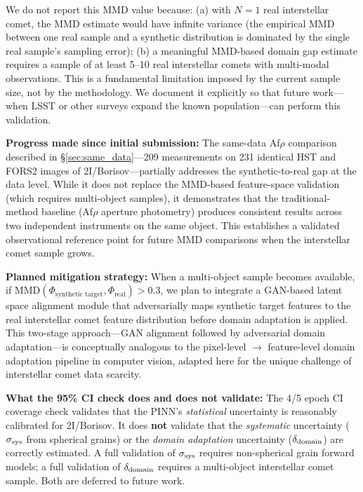 \documentclass[usenatbib]{mnras}
\begin{document}
We do not report this MMD value because: (a) with $N=1$ real interstellar comet, the MMD estimate would have infinite variance (the empirical MMD between one real sample and a synthetic distribution is dominated by the single real sample's sampling error); (b) a meaningful MMD-based domain gap estimate requires a sample of at least 5--10 real interstellar comets with multi-modal observations. This is a fundamental limitation imposed by the current sample size, not by the methodology. We document it explicitly so that future work---when LSST or other surveys expand the known population---can perform this validation.

\textbf{Progress made since initial submission:} The same-data Af$\rho$ comparison described in \S\ref{sec:same_data}---209 measurements on 231 identical HST and FORS2 images of 2I/Borisov---partially addresses the synthetic-to-real gap at the data level. While it does not replace the MMD-based feature-space validation (which requires multi-object samples), it demonstrates that the traditional-method baseline (Af$\rho$ aperture photometry) produces consistent results across two independent instruments on the same object. This establishes a validated observational reference point for future MMD comparisons when the interstellar comet sample grows.

\textbf{Planned mitigation strategy:} When a multi-object sample becomes available, if $\text{MMD}(\Phi_{\text{synthetic target}}, \Phi_{\text{real}}) > 0.3$, we plan to integrate a GAN-based latent space alignment module \citep{ganin16} that adversarially maps synthetic target features to the real interstellar comet feature distribution before domain adaptation is applied. This two-stage approach---GAN alignment followed by adversarial domain adaptation---is conceptually analogous to the pixel-level $\to$ feature-level domain adaptation pipeline in computer vision, adapted here for the unique challenge of interstellar comet data scarcity.

\textbf{What the 95\% CI check does and does not validate:} The 4/5 epoch CI coverage check validates that the PINN's \textit{statistical} uncertainty is reasonably calibrated for 2I/Borisov. It does \textbf{not} validate that the \textit{systematic} uncertainty ($\sigma_{\rm sys}$ from spherical grains) or the \textit{domain adaptation} uncertainty ($\delta_{\rm domain}$) are correctly estimated. A full validation of $\sigma_{\rm sys}$ requires non-spherical grain forward models; a full validation of $\delta_{\rm domain}$ requires a multi-object interstellar comet sample. Both are deferred to future work.
\end{document}
